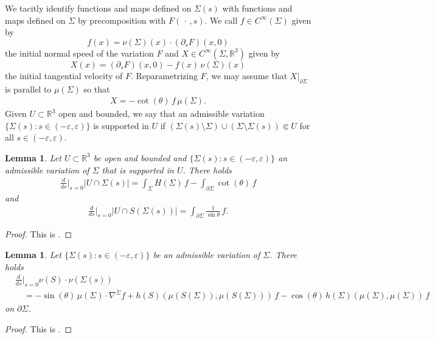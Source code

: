 \documentclass[11pt]{amsart}
\newtheorem{lem}[prop]{Lemma}
\begin{document}
\begin{appendices}
		 We tacitly identify functions and maps defined on $\Sigma(s)$ with functions and maps defined on $\Sigma$ by precomposition with $F(\,\cdot\,,s)$. We call $f\in C^\infty(\Sigma)$ given by 
		 $$
		 f(x)=\nu(\Sigma)(x)\cdot(\partial_sF)(x,0)$$
		 the initial normal speed of the variation $F$ and $X\in C^\infty(\Sigma,\mathbb{R}^3)$ given by 
		 $$
		 X(x)=(\partial_sF)(x,0)-f(x)\,\nu(\Sigma)(x)
		 $$
		 the initial tangential velocity of $F$. 	Reparametrizing $F$, we may assume that  $X|_{\partial \Sigma}$ is parallel to $\mu(\Sigma)$ so that 
	\begin{align} \label{speed comparison} 
		X=-\cot(\theta)\,f\,\mu( \Sigma).
	\end{align}
	Given $U\subset \mathbb{R}^3$ open and bounded, we say that an admissible variation $\{\Sigma(s):s\in(-\varepsilon,\varepsilon)\}$ is supported in $U$ if $(\Sigma(s)\setminus \Sigma) \cup (\Sigma\setminus \Sigma(s))\Subset U$ for all $s\in(-\varepsilon,\varepsilon)$.
		\begin{lem} \label{first variation}
			Let $U\subset \mathbb{R}^3$ be open and bounded and $\{\Sigma(s):s\in(-\varepsilon,\varepsilon)\}$ an admissible variation of $\Sigma$ that is supported in $U$.			 There holds
		\begin{align} \label{area first}  
			\frac{d}{ds}\bigg|_{s=0}|U\cap\Sigma(s)|=\int_{\Sigma}H(\Sigma)\,f-\int_{\partial\Sigma} \cot(\theta)\,f
		\end{align} 
		and
		\begin{align} \label{enclosed area first}
			\frac{d}{ds}\bigg|_{s=0} |U\cap S(\Sigma(s))|=\int_{\partial \Sigma} \frac{1}{\sin\theta}\,f.
		\end{align} 
		\end{lem}
		\begin{proof}
			This is \cite[Lemma 44]{eichmair2024penrose}.
		\end{proof}
		\begin{lem} \label{capillary change}
Let $\{\Sigma(s):s\in(-\varepsilon,\varepsilon)\}$ be an admissible variation of $\Sigma$.			There holds
			\begin{align*}
				&\frac{d}{ds}\bigg|_{s=0}\nu(S)\cdot  \nu(\Sigma(s))   \\&\quad =-\sin(\theta)\,\mu(\Sigma)\cdot \nabla^\Sigma f+h(S)(\mu(S(\Sigma)),\mu(S(\Sigma)))\,f-\cos(\theta)\,h(\Sigma)(\mu(\Sigma),\mu(\Sigma))\,f
			\end{align*}
			 on $\partial \Sigma$.
		\end{lem}
		\begin{proof}
			This is \cite[Lemma 43]{eichmair2024penrose}.
		\end{proof}
		

\end{appendices}
\end{document}
